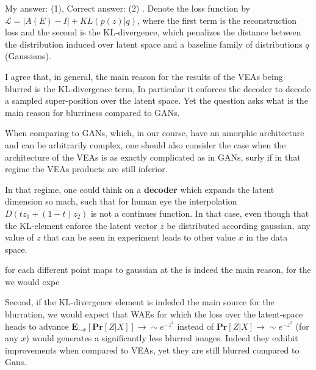 \documentclass{article}
\newcommand{\inb}[1]{ \color{blue}#1 \color{black} }
\begin{document}
\inb{ My answer: (1), Correct answer: (2)}. 
Denote the loss function by $\mathcal{L} = | A(E) - I | + KL( p(z) | q )$, where the first term is the reconstruction loss and the second is the KL-divergence, which penalizes the distance between the distribution induced over latent space and a baseline family of distributions $q$ (Gaussians).

I agree that, in general, the main reason for the results of the VEAs being blurred is the KL-divergence term, In particular it enforces the decoder to decode a sampled super-position over the latent space. Yet the question asks what is the main reason for blurriness compared to GANs.  

When comparing to GANs, which, in our course, have an amorphic architecture and can be arbitrarily complex, one should also consider the case when the architecture of the VEAs is as exactly complicated as in GANs, surly if in that regime the VEAs products are still inferior. 


In that regime, one could think on a \textbf{decoder} which expands the latent dimension so mach, such that for human eye the interpolation $D(tz_{1} + (1-t)z_{2})$ is not a continues function. In that case, even though that the KL-element enforce the latent vector $z$ be distributed according gaussian, any value of $z$ that can be seen in experiment leads to other value $x$ in the data space.  

for each different point  maps to gaussian at the 
is indeed the main reason, for the we would expe

Second, if the KL-divergence element is indeded the main source for the blurration, we would expect that WAEs for which the loss over the latent-space heads to advance $\mathbf{E}_{\sim x} \left[ \mathbf{Pr} \left[  Z | X \right]    \right] \rightarrow \sim e^{-z^{2}} $ instead of $ \mathbf{Pr} \left[  Z | X \right] \rightarrow \sim e^{-z^{2}} $ (for any $x$) would generates a significantly less blurred images. Indeed they exhibit improvements when compared to VEAs, yet they are still blurred compared to Gans.   
\end{document}
